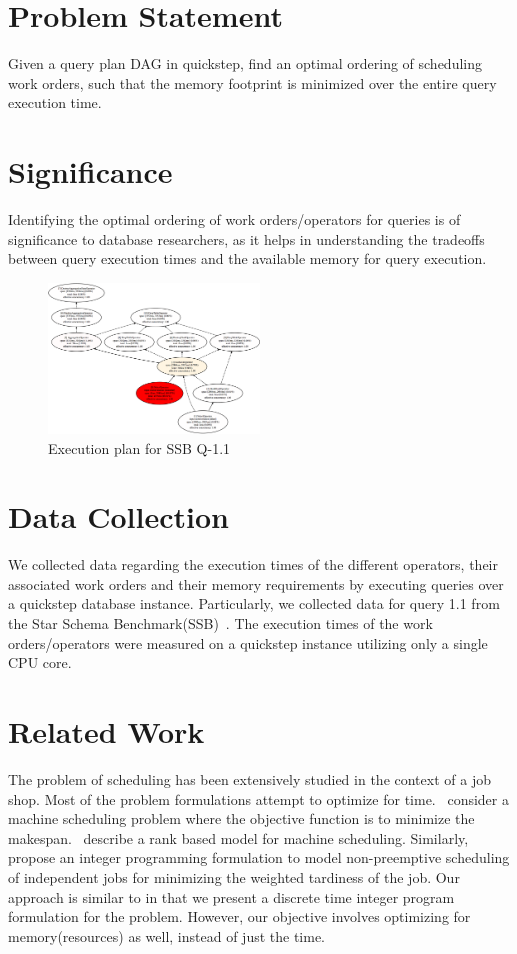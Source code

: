 \documentclass[20pt]{sigchi}
\begin{document}
\section{Problem Statement}
Given a query plan DAG in quickstep, find an optimal ordering of  scheduling work orders, such that the memory footprint is minimized over the entire query execution time. 
\vspace{-0.6em}
\section{Significance}
Identifying the optimal ordering of work orders/operators  for queries is of significance to database researchers, as it helps  in understanding the tradeoffs between query execution times 
and the available memory for query execution. 
\begin{figure}
  \centering
    \includegraphics[width=0.5\textwidth]{figures/ssb1}
      \caption{Execution plan for SSB Q-1.1}
      \label{fig2:execution-plan}
\end{figure}
\section{Data Collection}
We collected data regarding the execution times of the different operators, their associated work orders  and their memory requirements by executing queries over a quickstep database instance. Particularly, we collected data for query 1.1 from the Star Schema Benchmark(SSB)~\cite{o2007star}. The execution times of the work orders/operators were measured on a quickstep instance utilizing only a single CPU core. 
\section{Related Work}
The problem of scheduling has been extensively studied in the context of a job shop. Most of the problem formulations attempt to optimize for time.~\cite{lenstra1978complexity} consider  a machine scheduling problem where the objective function is to minimize the makespan.~\cite{wagner1959integer} describe a rank based model for machine scheduling. 
Similarly, ~\cite{luh1988parallel,hoitomt1990scheduling,luh1990schedule} propose an integer programming formulation to model non-preemptive scheduling of independent jobs for minimizing the weighted tardiness of the job.  Our approach is similar to in that we present  a discrete time integer program formulation  for the problem. However, our objective involves optimizing for memory(resources) as well, instead of just the time.
\end{document}
